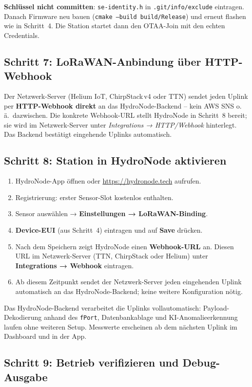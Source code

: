 \documentclass[11pt,a4paper]{scrartcl}
\begin{document}
\textbf{Schlüssel nicht committen}: \texttt{se-identity.h} in \texttt{.git/info/exclude} eintragen. Danach Firmware neu bauen (\texttt{cmake --build build/Release}) und erneut flashen wie in Schritt~4. Die Station startet dann den OTAA-Join mit den echten Credentials.

\subsection*{Schritt 7: LoRaWAN-Anbindung über HTTP-Webhook}

Der Netzwerk-Server (Helium IoT, ChirpStack\,v4 oder TTN) sendet jeden Uplink per \textbf{HTTP-Webhook direkt} an das HydroNode-Backend – kein AWS SNS o.\,ä.\ dazwischen. Die konkrete Webhook-URL stellt HydroNode in Schritt~8 bereit; sie wird im Netzwerk-Server unter \textit{Integrations → HTTP/Webhook} hinterlegt. Das Backend bestätigt eingehende Uplinks automatisch.

\subsection*{Schritt 8: Station in HydroNode aktivieren}

\begin{enumerate}
  \item HydroNode-App öffnen oder \url{https://hydronode.tech} aufrufen.
  \item Registrierung: erster Sensor-Slot kostenlos enthalten.
  \item Sensor auswählen → \textbf{Einstellungen → LoRaWAN-Binding}.
  \item \textbf{Device-EUI} (aus Schritt~4) eintragen und auf \textbf{Save} drücken.
  \item Nach dem Speichern zeigt HydroNode einen \textbf{Webhook-URL} an. Diesen URL im Netzwerk-Server (TTN, ChirpStack oder Helium) unter \textbf{Integrations → Webhook} eintragen.
  \item Ab diesem Zeitpunkt sendet der Netzwerk-Server jeden eingehenden Uplink automatisch an das HydroNode-Backend; keine weitere Konfiguration nötig.
\end{enumerate}

Das HydroNode-Backend verarbeitet die Uplinks vollautomatisch: Payload-Dekodierung anhand des \texttt{fPort}, Datenbankablage und KI-Anomalieerkennung laufen ohne weiteren Setup. Messwerte erscheinen ab dem nächsten Uplink im Dashboard und in der App.

\subsection*{Schritt 9: Betrieb verifizieren und Debug-Ausgabe}
\end{document}
